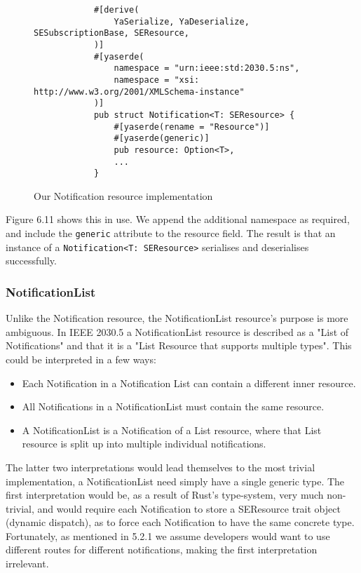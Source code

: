 \begin{figure}[H]
    \begin{center}
        \begin{lstlisting}
            #[derive(
                YaSerialize, YaDeserialize, SESubscriptionBase, SEResource,
            )]
            #[yaserde(
                namespace = "urn:ieee:std:2030.5:ns",
                namespace = "xsi: http://www.w3.org/2001/XMLSchema-instance"
            )]
            pub struct Notification<T: SEResource> {
                #[yaserde(rename = "Resource")]
                #[yaserde(generic)]
                pub resource: Option<T>,
                ...
            }    
        \end{lstlisting}
        \label{fig:notifimpl}
        \caption{Our Notification resource implementation}
    \end{center}
\end{figure}

Figure 6.11 shows this in use. We append the additional namespace as required, and include the \texttt{generic} attribute to the resource field. The result is that an instance of a \texttt{Notification<T: SEResource>} serialises and deserialises successfully. 


\subsubsection{NotificationList}
Unlike the Notification resource, the NotificationList resource's purpose is more ambiguous. In IEEE 2030.5 a NotificationList resource is described as a "List of Notifications" and that it is a "List Resource that supports multiple types". This could be interpreted in a few ways:

\begin{itemize}
    \item Each Notification in a Notification List can contain a different inner resource.
    \item All Notifications in a NotificationList must contain the same resource.
    \item A NotificationList is a Notification of a List resource, where that List resource is split up into multiple individual notifications.
\end{itemize}

The latter two interpretations would lead themselves to the most trivial implementation, a NotificationList need simply have a single generic type. The first interpretation would be, as a result of Rust's type-system, very much non-trivial, and would require each Notification to store a SEResource trait object (dynamic dispatch), as to force each Notification to have the same concrete type.
Fortunately, as mentioned in 5.2.1 we assume developers would want to use different routes for different notifications, making the first interpretation irrelevant.

